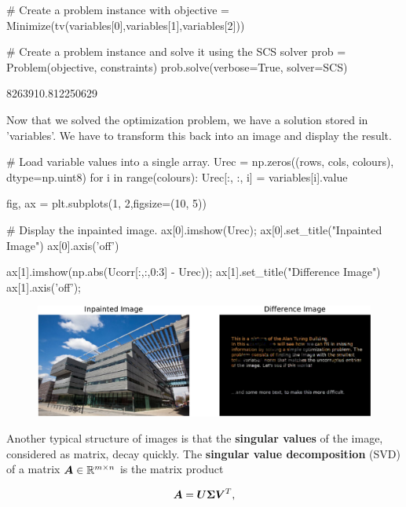 \begin{example}
\begin{ipythonnb}[11]
# Create a problem instance with
objective = Minimize(tv(variables[0],variables[1],variables[2]))

# Create a problem instance and solve it using the SCS solver
prob = Problem(objective, constraints)
prob.solve(verbose=True, solver=SCS)
\end{ipythonnb}
\begin{ipythonnbout}[11]
8263910.812250629
\end{ipythonnbout}

Now that we solved the optimization problem, we have a solution stored in 'variables'. We have to transform this back into an image and display the result.

\begin{ipythonnb}[12]

# Load variable values into a single array.
Urec = np.zeros((rows, cols, colours), dtype=np.uint8)
for i in range(colours):
    Urec[:, :, i] = variables[i].value

fig, ax = plt.subplots(1, 2,figsize=(10, 5))

# Display the inpainted image.
ax[0].imshow(Urec);
ax[0].set_title("Inpainted Image")
ax[0].axis('off')

ax[1].imshow(np.abs(Ucorr[:,:,0:3] - Urec));
ax[1].set_title("Difference Image")
ax[1].axis('off');
\end{ipythonnb}

\begin{figure}[h!]
\centering
\includegraphics[width=1\textwidth]{images/alanturing2-crop.pdf}
\end{figure}

Another typical structure of images is that the \textbf{singular values} of the image, considered as matrix, decay quickly. The \textbf{singular value decomposition} (SVD) of a matrix $\bm{A}\in \mathbb{R}^{m\times n}$ is the matrix product

\begin{equation*}
  \bm{A} = \bm{U}\bm{\Sigma}\bm{V}^{T},
\end{equation*}


\end{example}
